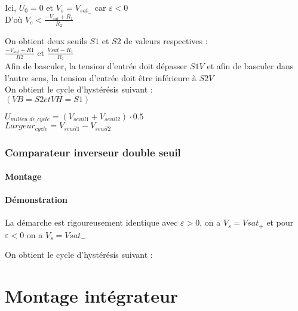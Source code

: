 Ici, $U_0=0$ et $V_s=V_{sat_-}$ car $\varepsilon<0$ \\

D'où $V_e < \frac{-V_{sat} + R_1}{R_2}$



On obtient deux seuils $S1$ et $S2$ de valeurs respectives : \\


$\frac{-V_{sat}+R1}{R2}$ et $\frac{Vsat - R_1}{R_2}$ \\



Afin de basculer, la tension d’entrée doit dépasser $S1 V$ et afin de basculer dans l’autre sens, la tension d’entrée doit 
être inférieure à $S2 V$ \\


On obtient le cycle d’hystérésis suivant : \\

$(VB=S2 et VH=S1)$




$U_{milieu\_de\_cycle}=(V_{seuil1}+V_{seuil2}) \cdot 0.5$ \\
$Largeur_{cycle}=V_{seuil1}-V_{seuil2}$



\subsection{Comparateur inverseur double seuil}

\subsubsection{Montage}


\subsubsection{Démonstration}

La démarche est rigoureusement identique avec $\varepsilon>0$, on a $V_s=Vsat_+$
et pour  $\varepsilon<0$ on a $V_s=Vsat_-$

On obtient le cycle d’hystérésis suivant : \\


\chapter{Montage intégrateur}
